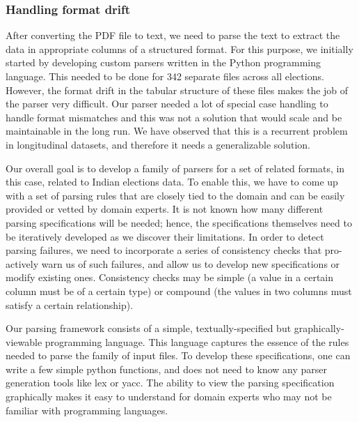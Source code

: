 \subsubsection{Handling format drift} After converting the PDF file to text, we need to parse the text to extract the data in appropriate columns of a structured format. For this purpose, we initially started by developing custom parsers written in the Python programming language. This needed to be done for 342 separate files across all elections. However, the format drift in the tabular structure of these files makes the job of the parser very difficult. Our parser needed a lot of special case handling to handle format mismatches and this was not a solution that would scale and be maintainable in the long run. We have observed that this is a recurrent problem in longitudinal datasets, and therefore it needs a generalizable solution.

Our overall goal is to develop a family of parsers for a set of related formats, in this case, related to Indian elections data. To enable this, we have to come up with a set of parsing rules that are closely tied to the domain and can be easily provided or vetted by domain experts. It is not known how many different parsing specifications will be needed; hence, the specifications themselves need to be iteratively developed as we discover their limitations. In order to detect parsing failures, we need to incorporate a series of consistency checks that pro-actively warn us of such failures, and allow us to develop new specifications or modify existing ones. Consistency checks may be simple (a value in a certain column must be of a certain type) or compound (the values in two columns must satisfy a certain relationship).

Our parsing framework consists of a simple, textually-specified but graphically-viewable programming language. This language captures the essence of the rules needed to parse the family of input files. To develop these specifications, one can write a few simple python functions, and does not need to know any parser generation tools like lex or yacc. The ability to view the parsing specification graphically makes it easy to understand for domain experts who may not be familiar with programming languages.


